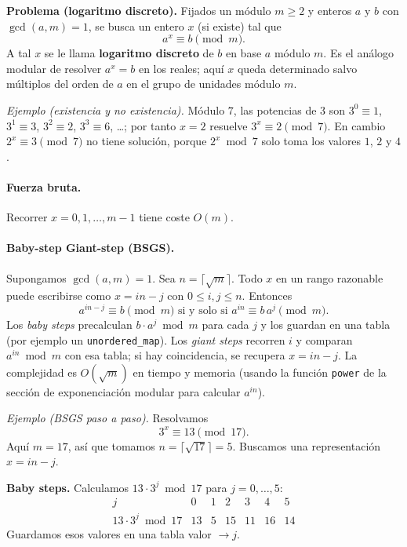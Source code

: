 \textbf{Problema (logaritmo discreto).} Fijados un módulo $m \ge 2$ y enteros $a$ y $b$ con $\gcd(a,m)=1$, se busca un entero $x$ (si existe) tal que
\[
a^x \equiv b \pmod{m}.
\]
A tal $x$ se le llama \textbf{logaritmo discreto} de $b$ en base $a$ módulo $m$. Es el análogo modular de resolver $a^x = b$ en los reales; aquí $x$ queda determinado salvo múltiplos del orden de $a$ en el grupo de unidades módulo $m$.

\textit{Ejemplo (existencia y no existencia).} Módulo $7$, las potencias de $3$ son $3^0 \equiv 1$, $3^1 \equiv 3$, $3^2 \equiv 2$, $3^3 \equiv 6$, \ldots; por tanto $x = 2$ resuelve $3^x \equiv 2 \pmod{7}$. En cambio $2^x \equiv 3 \pmod{7}$ no tiene solución, porque $2^x \bmod 7$ solo toma los valores $1$, $2$ y $4$.

\paragraph{Fuerza bruta.} Recorrer $x = 0,1,\ldots,m-1$ tiene coste $O(m)$.

\paragraph{Baby-step Giant-step (BSGS).} Supongamos $\gcd(a,m)=1$. Sea $n = \lceil \sqrt{m} \rceil$. Todo $x$ en un rango razonable puede escribirse como $x = i n - j$ con $0 \le i,j \le n$. Entonces
\[
a^{in-j} \equiv b \pmod{m}
\text{ si y solo si }
a^{in} \equiv b\,a^{j} \pmod{m}.
\]
Los \emph{baby steps} precalculan $b \cdot a^j \bmod m$ para cada $j$ y los guardan en una tabla (por ejemplo un \texttt{unordered\_map}). Los \emph{giant steps} recorren $i$ y comparan $a^{in} \bmod m$ con esa tabla; si hay coincidencia, se recupera $x = in - j$. La complejidad es $O(\sqrt{m})$ en tiempo y memoria (usando la función \texttt{power} de la sección de exponenciación modular para calcular $a^{in}$).

\textit{Ejemplo (BSGS paso a paso).} Resolvamos
\[
3^x \equiv 13 \pmod{17}.
\]
Aquí $m=17$, así que tomamos $n=\lceil\sqrt{17}\rceil=5$. Buscamos una representación $x=in-j$.

\textbf{Baby steps.} Calculamos $13\cdot 3^j \bmod 17$ para $j=0,\ldots,5$:
\[
\begin{array}{c|cccccc}
j & 0 & 1 & 2 & 3 & 4 & 5\\ \hline
13\cdot 3^j \bmod 17 & 13 & 5 & 15 & 11 & 16 & 14
\end{array}
\]
Guardamos esos valores en una tabla valor $\to j$.

